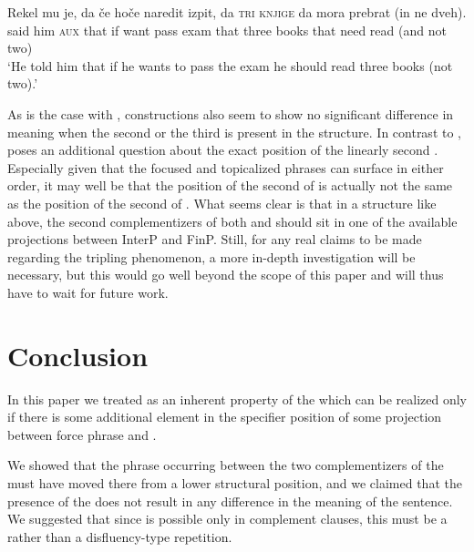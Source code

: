 \documentclass[output=paper,colorlinks,citecolor=brown]{langsci/langscibook}
\begin{document}
\begin{exe}
\ex \label{ex:plesnicar:44}
\gll Rekel 	mu 	je, 	da 	če 	hoče 	naredit 	izpit, 	da 	\textsc{tri} \textsc{knjige} 	da 	mora 	prebrat 	(in ne dveh).\\
 said 	him	\textsc{aux} that if want pass exam that	three books that need	read (and not two)\\
\trans `He told him that if he wants to pass the exam he should read three books (not two).'
\end{exe}

\noindent As is the case with ,  constructions also seem to show no significant difference in meaning when the second or the third  is present in the structure. In contrast to ,  poses an additional question about the exact position of the linearly second . Especially given that the focused and topicalized phrases can surface in either order, it may well be that the position of the second  of  is actually not the same as the position of the second  of . What seems clear is that in a structure like  above, the second complementizers of both  and  should sit in one of the available projections between InterP and FinP. Still, for any real claims to be made regarding the tripling phenomenon, a more in-depth investigation will be necessary, but this would go well beyond the scope of this paper and will thus have to wait for future work.

\section{Conclusion}

In this paper we treated   as an inherent property of the  which can be realized only if there is some additional element in the specifier position of some projection between force phrase and .

We showed that the phrase occurring between the two complementizers of the  must have moved there from a lower structural position, and we claimed that the presence of the   does not result in any difference in the meaning of the sentence. We suggested that since  is possible only in complement clauses, this must be a  rather than a disfluency-type repetition.
\end{document}
